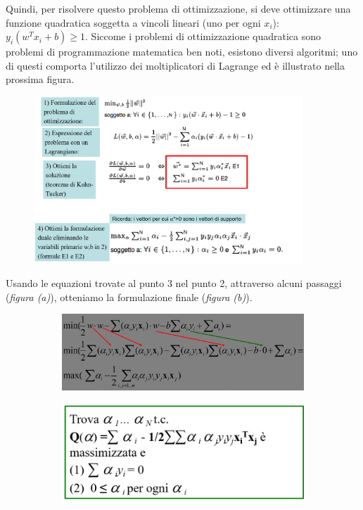 \documentclass[a4paper,oneside,titlepage]{book}
\begin{document}
\noindent
Quindi, per risolvere questo problema di ottimizzazione, si deve ottimizzare una funzione quadratica soggetta a vincoli lineari (uno per ogni $x_i$): $y_i (w^T x_i + b) \geq 1$. Siccome i problemi di ottimizzazione quadratica sono problemi di programmazione matematica ben noti, esistono diversi algoritmi; uno di questi comporta l'utilizzo dei moltiplicatori di Lagrange ed è illustrato nella prossima figura.
\begin{figure}[htp]
	\centering
	\includegraphics[width=0.9\textwidth]{svm-lin3.png}
\end{figure}
\newpage
\noindent
Usando le equazioni trovate al punto 3 nel punto 2, attraverso alcuni passaggi (\textit{figura (a)}), otteniamo la formulazione finale (\textit{figura (b)}).
\begin{figure}[htp]
	\begin{subfigure}{0.49\textwidth}
	    \centering
		\includegraphics[width=\textwidth, height=\textheight, keepaspectratio]{svm-lin4.png}
		\caption{}
	\end{subfigure}
	\hfill
	\begin{subfigure}{0.49\textwidth}
	    \centering
		\includegraphics[width=\textwidth, height=\textheight, keepaspectratio]{svm-lin5.png}
		\caption{}
	\end{subfigure}
\end{figure}
\end{document}
